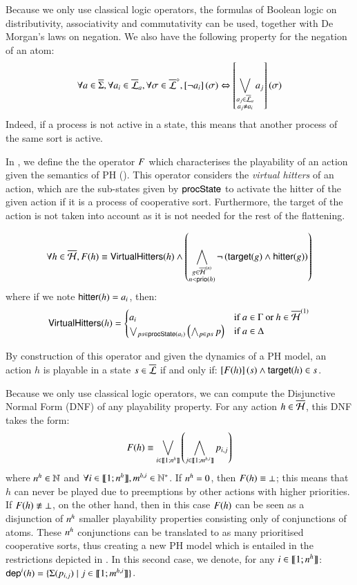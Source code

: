 Because we only use classical logic operators, the formulas of Boolean logic on 
distributivity, associativity and commutativity can be used, together with De Morgan's laws on negation.
We also have the following property for the negation of an atom:
\[\forall a \in \overline{\Sigma}, \forall a_i \in \overline{\mathcal{L}}_a, \forall \sigma \in \overline{\mathcal{L}}^\diamond,
  \left[\neg a_i\right](\sigma) \Leftrightarrow \left[\bigvee_{\substack{a_j \in \overline{\mathcal{L}}_a\\a_j \neq a_i}} a_j\right](\sigma)\]
Indeed, if a process is not active in a state, this means that another process of the same sort is active.

In , we define the the operator $F$ which characterises the playability of an action
given the semantics of PH ().
This operator considers the \emph{virtual hitters} of an action,
which are the sub-states given by $\mathsf{procState}$ to activate the hitter of the given action if it is a process of cooperative sort.
Furthermore, the target of the action is not taken into account as it is not needed for the rest of the flattening.
%
\begin{definition}\label{def:fop}
  \[\forall h \in \overline{\mathcal{H}}, F(h) \equiv \mathsf{VirtualHitters}(h) \wedge
    \left( \bigwedge_{\substack{g \in \overline{\mathcal{H}}^{(n)}\\n < \mathsf{prio}(h)}}
    \neg \left( \mathsf{target}(g) \wedge \mathsf{hitter}(g)\right) \right)\]
  where if we note $\mathsf{hitter}(h) = a_i$, then:
  \[\mathsf{VirtualHitters}(h) =
    \begin{cases}
      a_i & \text{if } a \in \Gamma \text{ or } h \in \overline{\mathcal{H}}^{(1)} \\
      \bigvee_{ps \in \mathsf{procState}(a_i)} \left( \bigwedge_{p \in ps} p \right) & \text{if } a \in \Delta
    \end{cases}\]
\end{definition}
%
By construction of this operator and given the dynamics of a PH model,
an action $h$ is playable in a state $s \in \overline{\mathcal{L}}$ if and only if: $\left[F(h)\right](s) \wedge \mathsf{target}(h) \in s$.

Because we only use classical logic operators, we can compute the Disjunctive Normal Form (DNF) of any playability property.
For any action $h \in \overline{\mathcal{H}}$, this DNF takes the form:
\[F(h) \equiv \bigvee_{i \in \llbracket 1; n^{h} \rrbracket} \left( \bigwedge_{j \in \llbracket 1; m^{h,i} \rrbracket} p_{i,j} \right)\]
where $n^{h} \in \mathbb{N}$ and $\forall i \in \llbracket 1; n^{h} \rrbracket, m^{h,i} \in \mathbb{N}^*$.
If $n^{h} = 0$, then $F(h) \equiv \bot$; this means that $h$ can never be played
due to preemptions by other actions with higher priorities.
If $F(h) \not\equiv \bot$, on the other hand, then in this case $F(h)$
can be seen as a disjunction of $n^{h}$ smaller playability properties consisting only of conjunctions of atoms.
These $n^{h}$ conjunctions can be translated to as many prioritised cooperative sorts,
thus creating a new PH model which is entailed in the restrictions depicted in .
In this second case, we denote, for any $i \in \llbracket 1; n^{h} \rrbracket$:
$\mathsf{dep}^{i}(h) = \{ \Sigma(p_{i,j}) \mid j \in \llbracket 1; m^{h,i} \rrbracket \}$.

